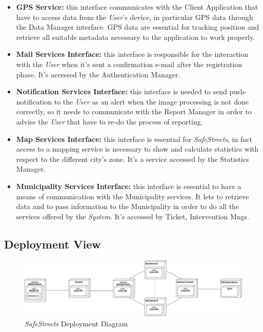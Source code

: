 \documentclass{article}
\begin{document}
		\begin{itemize}
			\item {\bf GPS Service:} this interface communicates with the Client Application that have to access data from the {\it User}'s device, in particular GPS data through the Data Manager interface. GPS data are essential for tracking position and retrieve all suitable metadata necessary to the application to work properly. 
			\item {\bf Mail Services Interface:} this interface is responsible for the interaction with the {\it User} when it's sent a confirmation e-mail after the registration phase. It's accessed by the Authentication Manager.
			\item {\bf Notification Services Interface:} this interface is needed to send push-notification to the {\it User} as an alert when the image processing is not done correctly, so it needs to communicate with the Report Manager in order to advise the {\it User} that have to re-do the process of reporting. 
			\item {\bf Map Services Interface:} this interface is essential for {\it SafeStreets}, in fact access to a mapping service is necessary to show and calculate statistics with respect to the different city's zone. It's a service accessed by the Statistics Manager.
			\item {\bf Municipality Services Interface:} this interface is essential to have a means of communication with the Municipality services. It lets to retrieve data and to pass information to the Municipality in order to do all the services offered by the {\it System}. It's accessed by Ticket, Intervention Mngs. 
		\end{itemize}
		
		\pagebreak
		
	\subsection{Deployment View}
		\begin{figure}[H]
			\centering
			\includegraphics[scale=0.25]{Images/Diagrams/deployment_diagram.png}
			\caption{{\it SafeStreets} Deployment Diagram}
				\end{figure}
		
\end{document}
